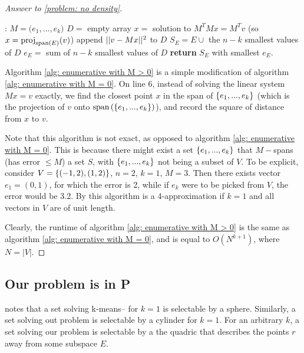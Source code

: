\documentclass{article}
\begin{document}
\begin{proof}[Answer to \ref{problem: no density}]
\begin{algorithm}[H]
      \caption{}\label{alg: enumerative with M > 0}
    \begin{algorithmic}[1]
    :
        \State $M = \Big(e_1,...,e_k\Big)$
        \State $D = $ empty array
            \State $x=$ solution to $M^TMx = M^Tv$ (so $x=\text{proj}_{\text{span}\left(E\right)}(v)$)
            \State append $||v-Mx||^2$ to $D$
        \EndFor
        \State $S_E = E\cup$ the $n-k$ smallest values of $D$
        \State $e_E = $ sum of $n-k$ smallest values of $D$
    \EndFor
    \State \textbf{return} $S_E$ with smallest $e_E$.
    \EndProcedure
    \end{algorithmic}
\end{algorithm}
Algorithm \ref{alg: enumerative with M > 0} is a simple modification of algorithm \ref{alg: enumerative with M = 0}. On line 6, instead of solving the linear system $Mx = v$ exactly, we find the closest point $x$ in the span of $\left\{e_1,...,e_k\right\}$ (which is the projection of $v$ onto $\text{span}\left(\left\{e_1,...,e_k\right\}\right)$), and record the square of distance from $x$ to $v$.

Note that this algorithm is not exact, as opposed to algorithm \ref{alg: enumerative with M = 0}. This is because there might exist a set $\left\{e_1,...,e_k\right\}$ that $M-$spans (has error $\leq M$) a set $S$, with $\left\{e_1,...,e_k\right\}$ not being a subset of $V$. To be explicit, consider $V=\left\{(-1,2),(1,2)\right\}$, $n=2$, $k=1$, $M = 3$. Then there exists vector $e_1=(0,1)$, for which the error is 2, while if $e_k$ were to be picked from $V$, the error would be 3.2. By \cite{rademacher2005matrix} this algorithm is a 4-approximation if $k=1$ and all vectors in $V$ are of unit length.

Clearly, the runtime of algorithm \ref{alg: enumerative with M > 0} is the same as algorithm \ref{alg: enumerative with M = 0}, and is equal to $O(N^{k+1})$, where $N = |V|$.
\end{proof}

\subsection{Our problem is in \textbf{P}}\label{subsection: our problem is in P}
\cite{chawla2013k} notes that a set solving k-means-- for $k=1$ is selectable by a sphere. Similarly, a set solving out problem is selectable by a cylinder for $k=1$. For an arbitrary $k$, a set solving our problem is selectable by a the quadric that describes the points $r$ away from some subspace $E$.
\end{document}
